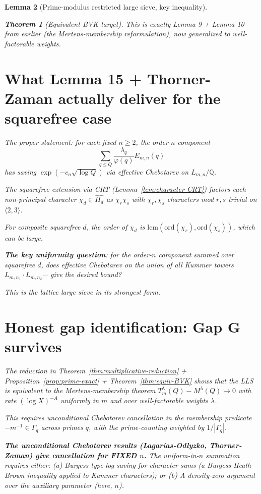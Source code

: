 \documentclass[11pt]{article}
\newtheorem{theorem}{Theorem}[section]
\newtheorem{lemma}[theorem]{Lemma}
\newcommand{\Q}{\mathbb Q}
\begin{document}
\begin{lemma}[Prime-modulus restricted large sieve, key inequality]
\begin{theorem}[Equivalent BVK target]
This is exactly Lemma 9 + Lemma 10 from earlier (the Mertens-membership reformulation), now generalized to well-factorable weights.

\section{What Lemma 15 + Thorner-Zaman actually deliver for the squarefree case}

The proper statement: for each fixed $n \geq 2$, the order-$n$ component
\[
\sum_{q \leq Q} \frac{\lambda_q}{\varphi(q)} E_{m,n}(q)
\]
has saving $\exp(-c_n \sqrt{\log Q})$ via effective Chebotarev on $L_{m,n}/\Q$.

The squarefree extension via CRT (Lemma~\ref{lem:character-CRT}) factors each non-principal character $\chi_d \in \widehat{H_d}$ as $\chi_r \chi_s$ with $\chi_r, \chi_s$ characters mod $r, s$ trivial on $\langle 2, 3\rangle$.

For composite squarefree $d$, the order of $\chi_d$ is $\text{lcm}(\text{ord}(\chi_r), \text{ord}(\chi_s))$, which can be large.

\textbf{The key uniformity question}: for the order-$n$ component summed over squarefree $d$, does effective Chebotarev on the union of all Kummer towers $L_{m,n_1} \cdot L_{m,n_2} \cdots$ give the desired bound?

This is the lattice large sieve in its strongest form.

\section{Honest gap identification: Gap G survives}

The reduction in Theorem~\ref{thm:multiplicative-reduction} + Proposition~\ref{prop:prime-exact} + Theorem~\ref{thm:equiv-BVK} shows that the LLS is equivalent to the Mertens-membership theorem $T_m^\lambda(Q) - M^\lambda(Q) \to 0$ with rate $(\log X)^{-A}$ uniformly in $m$ and over well-factorable weights $\lambda$.

This requires unconditional Chebotarev cancellation in the membership predicate $-m^{-1} \in \Gamma_q$ across primes $q$, with the prime-counting weighted by $1/|\Gamma_q|$.

\textbf{The unconditional Chebotarev results (Lagarias-Odlyzko, Thorner-Zaman) give cancellation for FIXED $n$.} The uniform-in-$n$ summation requires either:
(a) Burgess-type log saving for character sums (a Burgess-Heath-Brown inequality applied to Kummer characters); or
(b) A density-zero argument over the auxiliary parameter (here, $n$).


\end{theorem}
\end{lemma}
\end{document}
